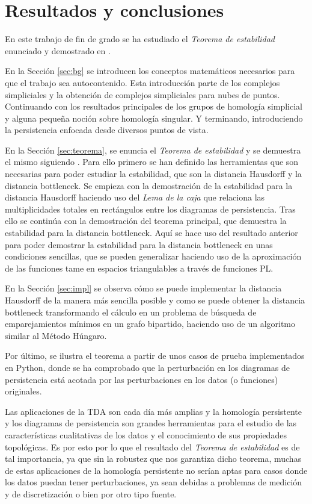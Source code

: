 \chapter{Resultados y conclusiones}
En este trabajo de fin de grado se ha estudiado el \emph{Teorema de estabilidad} enunciado y demostrado en \cite{Cohen-Steiner2007}.

En la Sección \ref{sec:bg} se introducen los conceptos matemáticos necesarios para que el trabajo sea autocontenido. Esta introducción parte de los complejos simpliciales y la obtención de complejos simpliciales para nubes de puntos. Continuando con los resultados principales de los grupos de homología simplicial y alguna pequeña noción sobre homología singular. Y terminando, introduciendo la persistencia enfocada desde diversos puntos de vista.

En la Sección \ref{sec:teorema}, se enuncia el \emph{Teorema de estabilidad} y se demuestra el mismo siguiendo \cite{Cohen-Steiner2007}. Para ello primero se han definido las herramientas que son necesarias para poder estudiar la estabilidad, que son la distancia Hausdorff y la distancia bottleneck. Se empieza con la demostración de la estabilidad para la distancia Hausdorff haciendo uso del \emph{Lema de la caja} que relaciona las multiplicidades totales en rectángulos entre los diagramas de persistencia. Tras ello se continúa con la demostración del teorema principal, que demuestra la estabilidad para la distancia bottleneck. Aquí se hace uso del resultado anterior para poder demostrar la estabilidad para la distancia bottleneck en unas condiciones sencillas, que se pueden generalizar haciendo uso de la aproximación de las funciones tame en espacios triangulables a través de funciones PL.

En la Sección \ref{sec:impl} se observa cómo se puede implementar la distancia Hausdorff de la manera más sencilla posible y como se puede obtener la distancia bottleneck transformando el cálculo en un problema de búsqueda de emparejamientos mínimos en un grafo bipartido, haciendo uso de un algoritmo similar al Método Húngaro.

Por último, se ilustra el teorema a partir de unos casos de prueba implementados en Python, donde se ha comprobado que la perturbación en los diagramas de persistencia está acotada por las perturbaciones en los datos (o funciones) originales.

Las aplicaciones de la TDA son cada día más amplias y la homología persistente y los diagramas de persistencia son grandes herramientas para el estudio de las características cualitativas de los datos y el conocimiento de sus propiedades topológicas. Es por esto por lo que el resultado del \emph{Teorema de estabilidad} es de tal importancia, ya que sin la robustez que nos garantiza dicho teorema, muchas de estas aplicaciones de la homología persistente no serían aptas para casos donde los datos puedan tener perturbaciones, ya sean debidas a problemas de medición y de discretización o bien por otro tipo fuente. 